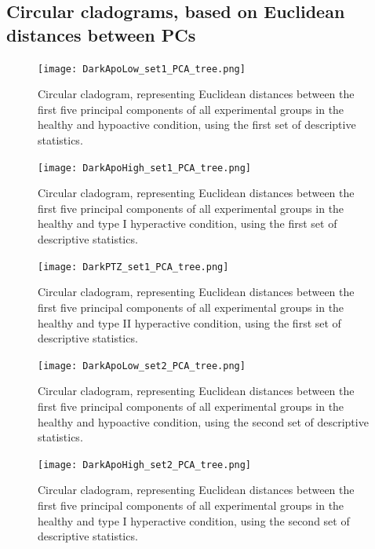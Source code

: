 \subsection{Circular cladograms, based on Euclidean distances between PCs}
\begin{figure}[h!]
\begin{center}
\texttt{[image: DarkApoLow\_set1\_PCA\_tree.png]}
\caption{Circular cladogram, representing Euclidean distances between the first five principal components of all experimental groups in the healthy and hypoactive condition, using the first set of descriptive statistics.}
\end{center}
\end{figure}
\begin{figure}[h!]
\begin{center}
\texttt{[image: DarkApoHigh\_set1\_PCA\_tree.png]}
\caption{Circular cladogram, representing Euclidean distances between the first five principal components of all experimental groups in the healthy and type I hyperactive condition, using the first set of descriptive statistics.}
\end{center}
\end{figure}
\begin{figure}[h!]
\begin{center}
\texttt{[image: DarkPTZ\_set1\_PCA\_tree.png]}
\caption{Circular cladogram, representing Euclidean distances between the first five principal components of all experimental groups in the healthy and type II hyperactive condition, using the first set of descriptive statistics.}
\end{center}
\end{figure}
\begin{figure}[h!]
\begin{center}
\texttt{[image: DarkApoLow\_set2\_PCA\_tree.png]}
\caption{Circular cladogram, representing Euclidean distances between the first five principal components of all experimental groups in the healthy and hypoactive condition, using the second set of descriptive statistics.}
\end{center}
\end{figure}
\begin{figure}[h!]
\begin{center}
\texttt{[image: DarkApoHigh\_set2\_PCA\_tree.png]}
\caption{Circular cladogram, representing Euclidean distances between the first five principal components of all experimental groups in the healthy and type I hyperactive condition, using the second set of descriptive statistics.}
\end{center}
\end{figure}
